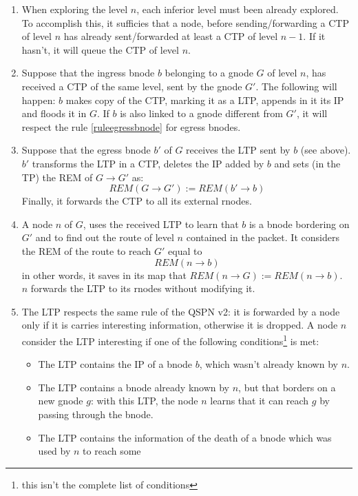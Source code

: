 \documentclass[a4paper]{article}
\begin{document}
\begin{enumerate}
	\item When exploring the level $n$, each inferior level must been
		already explored.\\
		To accomplish this, it sufficies that a
		node, before sending/forwarding a CTP of level $n$ has already
		sent/forwarded at least a CTP of level $n-1$. If it hasn't, it will
		queue the CTP of level $n$.
	\item Suppose that the ingress bnode $b$ belonging to a gnode $G$ of
		level $n$, has received a CTP of the same level, sent by the
		gnode $G'$. The following
		will happen: $b$ makes copy of the CTP, marking it as a LTP, appends in
		it its IP and floods it in $G$. If $b$ is also linked to a
		gnode different from $G'$, it will respect the rule
		\ref{ruleegressbnode} for egress bnodes. 
	\item \label{ruleegressbnode}
		Suppose that the egress bnode $b'$ of $G$ receives the LTP
		sent by $b$ (see above). $b'$ transforms the LTP in a CTP,
		deletes the IP added by $b$ and sets (in the TP) the REM of $G\rightarrow G'$
		as:
		\[
		REM(G\rightarrow G'):=REM(b'\rightarrow b)
		\]
		Finally, it forwards the CTP to all its external rnodes.
	\item A node $n$ of $G$, uses the received LTP to learn that $b$ is a
		bnode bordering on $G'$ and to find out the route of level $n$
		contained in the packet. It considers the REM of the route to
		reach $G'$ equal to
		\[
		REM(n\rightarrow b)
		\]
		in other words, it saves in its map that $REM(n\rightarrow
		G):=REM(n\rightarrow b)$.\\
		$n$ forwards the LTP to its rnodes without modifying it.
	\item The LTP respects the same rule of the QSPN v2: it is forwarded
		by a node only if it is carries interesting information,
		otherwise it is dropped. A
		node $n$ consider the LTP interesting if one of the following
		conditions\footnote{this isn't the complete list of
		conditions} is met:
		\begin{itemize}
			\item The LTP contains the IP of a bnode $b$, which wasn't
				already known by $n$.
			\item The LTP contains a bnode already known by $n$, but that
				borders on a new gnode $g$: with this LTP, the
				node $n$ learns that it can reach $g$ by
				passing through the bnode.
			\item The LTP contains the information of the death of
				a bnode which was used by $n$ to reach some

\end{itemize}
\end{enumerate}
\end{document}
